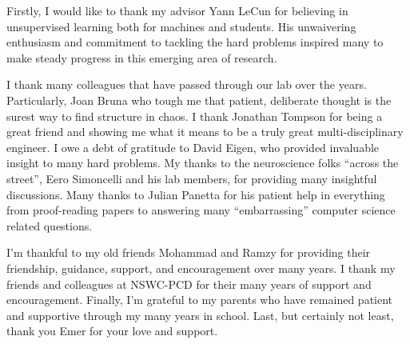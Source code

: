 Firstly, I would like to thank my advisor Yann LeCun for believing in
unsupervised learning both for machines and students. His unwaivering
enthusiasm and commitment to tackling the hard problems inspired many to make
steady progress in this emerging area of research.

I thank many colleagues that have passed through our lab over the years.
Particularly, Joan Bruna who tough me that patient, deliberate thought is the
surest way to find structure in chaos.  I thank Jonathan Tompson for being a
great friend and showing me what it means to be a truly great
multi-disciplinary engineer.  I owe a debt of gratitude to David Eigen, who
provided invaluable insight to many hard problems. My thanks to the
neuroscience folks ``across the street'', Eero Simoncelli and his lab members,
for providing many insightful discussions. Many thanks to Julian Panetta for
his patient help in everything from proof-reading papers to answering many
``embarrassing'' computer science related questions.  
      
I'm thankful to my old friends Mohammad and Ramzy for providing their
friendship, guidance, support, and encouragement over many years.  I thank my
friends and colleagues at NSWC-PCD for their many years of support and
encouragement. Finally, I'm grateful to my parents who have remained patient
and supportive through my many years in school.  Last, but certainly not least,
thank you Emer for your love and support.  

 
